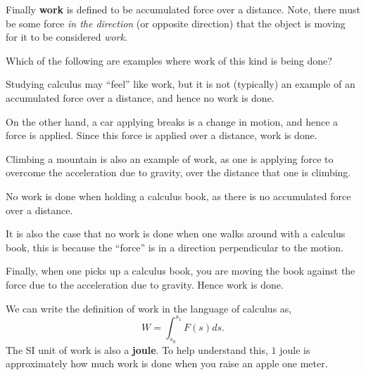 \documentclass{ximera}
\begin{document}
Finally \textbf{work} is defined to be accumulated force over a
distance. Note, there must be some force \textit{in the direction} (or
opposite direction) that the object is moving for it to be considered
\textit{work}.
\begin{question}
  Which of the following are examples where work of this kind is being done?
  \begin{selectAll}
  \end{selectAll}
  \begin{feedback}
    Studying calculus may ``feel'' like work, but it is not
    (typically) an example of an accumulated force over a distance,
    and hence no work is done.

    On the other hand, a car applying breaks is a change in motion, and
    hence a force is applied. Since this force is applied over a
    distance, work is done.

    Climbing a mountain is also an example of work, as one is applying
    force to overcome the acceleration due to gravity, over the
    distance that one is climbing.

    No work is done when holding a calculus book, as there is no
    accumulated force over a distance.

    It is also the case that no work is done when one walks around
    with a calculus book, this is because the ``force'' is in a
    direction perpendicular to the motion.

    Finally, when one picks up a calculus book, you are moving the
    book against the force due to the acceleration due to
    gravity. Hence work is done.
  \end{feedback}
\end{question}
We can write the definition of work in the language of calculus as,
\[
W = \int_{s_0}^{s_1} F(s) ds.
\]
The SI unit of work is also a \textbf{joule}. To help understand this,
$1$ joule is approximately how much work is done when you raise an
apple one meter.
\end{document}
